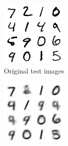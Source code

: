 \documentclass{article}
\begin{document}
\begin{figure}
  \centering
  \begin{subfigure}[b]{.2\textwidth}
    \centering
    \includegraphics[width=\textwidth]{report/images/lat2/vae_0.5_0.5_ep100_lat2_hid512_2201-0938.pt_original.png}
    \caption{Original test images}
    \label{subfig:original mnist}
  \end{subfigure}
  \hfill
  \begin{subfigure}[b]{.2\textwidth}
    \centering
    \includegraphics[width=\textwidth]{report/images/lat2/vae_0.5_0.5_ep100_lat2_hid512_2201-0938.pt_reconstructed.png}

\end{subfigure}
\end{figure}
\end{document}

